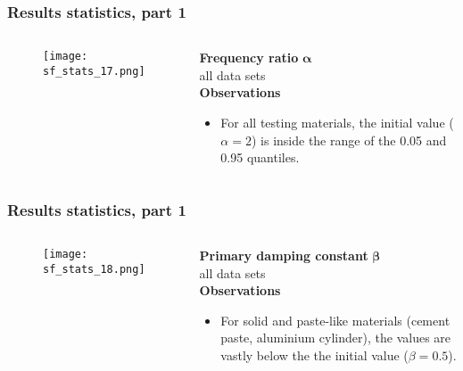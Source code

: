 	\def\gw{85mm}
	\begin{frame}
		\frametitle{Results \textendash{} statistics, part 1}\label{res:parerr1}
		\begin{columns}[t]
			\begin{RIPcolleft}
				\begin{figure}
					\texttt{[image: sf\_stats\_17.png]}
				\end{figure}
			\end{RIPcolleft}
			\begin{RIPcolright}
				\textbf{Frequency ratio }$\mathbf{\alpha}$\\
				all data sets\\
				\vspace*{.5em}
				\textbf{Observations}\\
				\begin{itemize}
					\item For all testing materials, the initial value ($\alpha = 2$) is inside the range of the 0.05 and 0.95 quantiles.
				\end{itemize}
			\end{RIPcolright}
		\end{columns}
	\end{frame}

	\begin{frame}
		\frametitle{Results \textendash{} statistics, part 1}
		\begin{columns}[t]
			\begin{RIPcolleft}
				\begin{figure}
					\texttt{[image: sf\_stats\_18.png]}
				\end{figure}
			\end{RIPcolleft}
			\begin{RIPcolright}
				\textbf{Primary damping constant }$\mathbf{\beta}$\\
				all data sets\\
				\vspace*{.5em}
				\textbf{Observations}\\
				\begin{itemize}
					\item For solid and paste-like materials (cement paste, aluminium cylinder), the values are vastly below the the initial value ($\beta = 0.5$).
				\end{itemize}
			\end{RIPcolright}
		\end{columns}
	\end{frame}

